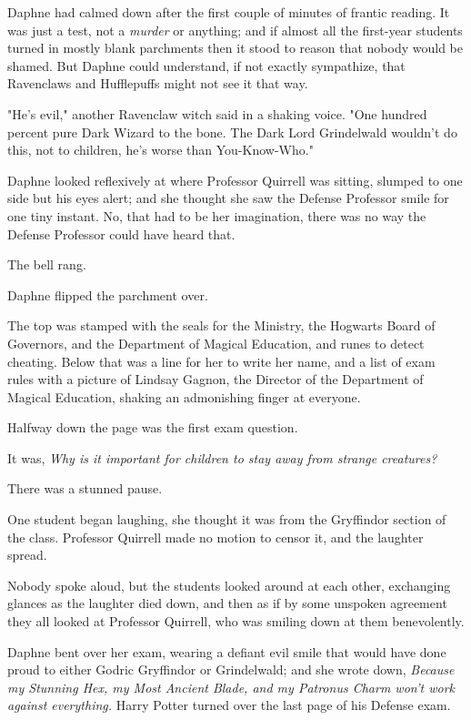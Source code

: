 Daphne had calmed down after the first couple of minutes of frantic reading. It
was just a test, not a \emph{murder} or anything; and if almost all the
first-year students turned in mostly blank parchments then it stood to reason
that nobody would be shamed. But Daphne could understand, if not exactly
sympathize, that Ravenclaws and Hufflepuffs might not see it that way.

"He's evil," another Ravenclaw witch said in a shaking voice. "One hundred
percent pure Dark Wizard to the bone. The Dark Lord Grindelwald wouldn't do
this, not to children, he's worse than You-Know-Who."

Daphne looked reflexively at where Professor Quirrell was sitting, slumped to
one side but his eyes alert; and she thought she saw the Defense Professor
smile for one tiny instant. No, that had to be her imagination, there was no
way the Defense Professor could have heard that.

The bell rang.

Daphne flipped the parchment over.

The top was stamped with the seals for the Ministry, the Hogwarts Board of
Governors, and the Department of Magical Education, and runes to detect
cheating. Below that was a line for her to write her name, and a list of exam
rules with a picture of Lindsay Gagnon, the Director of the Department of
Magical Education, shaking an admonishing finger at everyone.

Halfway down the page was the first exam question.

It was, \emph{Why is it important for children to stay away from strange
creatures?}

There was a stunned pause.

One student began laughing, she thought it was from the Gryffindor section of
the class. Professor Quirrell made no motion to censor it, and the laughter
spread.

Nobody spoke aloud, but the students looked around at each other, exchanging
glances as the laughter died down, and then as if by some unspoken agreement
they all looked at Professor Quirrell, who was smiling down at them
benevolently.

Daphne bent over her exam, wearing a defiant evil smile that would have done
proud to either Godric Gryffindor or Grindelwald; and she wrote down,
\emph{Because my Stunning Hex, my Most Ancient Blade, and my Patronus Charm
won't work against everything.}
\later
Harry Potter turned over the last page of his Defense exam.

